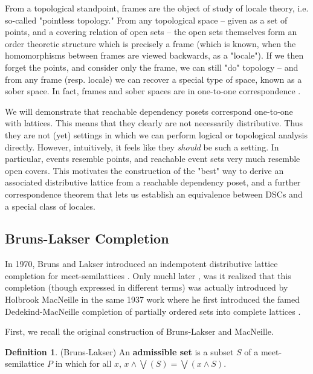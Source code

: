 \documentclass[hoptionsi,review,format=acmsmall]{acmart}
\theoremstyle{definition}
\newtheorem{definition}{Definition}[section]
\begin{document}
From a topological standpoint, frames are the object of study of locale theory, i.e. so-called "pointless topology." From any topological space -- given as a set of points, and a covering relation of open sets -- the open sets themselves form an order theoretic structure which is precisely a frame (which is known, when the homomorphisms between frames are viewed backwards, as a "locale"). If we then forget the points, and consider only the frame, we can still "do" topology -- and from any frame (resp. locale) we can recover a special type of space, known as a sober space. In fact, frames and sober spaces are in one-to-one correspondence \cite{johnstone1982stone, vickers1996topology}.

We will demonstrate that reachable dependency posets correspond one-to-one with lattices. This means that they clearly are not necessarily distributive. Thus they are not (yet) settings in which we can perform logical or topological analysis directly. However, intuitively, it feels like they \textit{should} be such a setting. In particular, events resemble points, and reachable event sets very much resemble open covers. This motivates the construction of the "best" way to derive an associated distributive lattice from a reachable dependency poset, and a further correspondence theorem that lets us establish an equivalence between DSCs and a special class of locales.

\subsection{Bruns-Lakser Completion}

In 1970, Bruns and Lakser introduced an indempotent distributive lattice completion for meet-semilattices \cite{bruns1970injective}. Only muchl later \cite{ball2016dedekind}, was it realized that this completion (though expressed in different terms) was actually introduced by  Holbrook MacNeille in the same 1937 work where he first introduced the famed Dedekind-MacNeille completion of partially ordered sets into complete lattices \cite{macneille1937partially}. 

First, we recall the original construction of Bruns-Lakser and MacNeille.

\begin{definition}
(Bruns-Lakser) An \textbf{admissible set} is a subset \(S\) of a meet-semilattice \(P\) in which for all \(x\), \(x \wedge \bigvee(S) = \bigvee(x \wedge S)\).
\end{definition}
\end{document}
